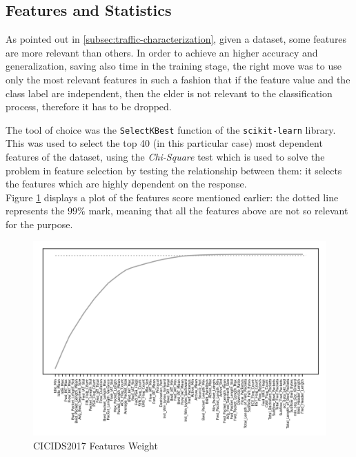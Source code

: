 
\subsection{Features and Statistics}
\label{subsec:features-statistics}

As pointed out in \ref{subsec:traffic-characterization}, given a dataset, some features are more relevant than others. In order to achieve an higher accuracy and generalization, saving also time in the training stage, the right move was to use only the most relevant features in such a fashion that if the feature value and the class label are independent, then the elder is not relevant to the classification process, therefore it has to be dropped.
\par The tool of choice was the \texttt{SelectKBest} function of the \texttt{scikit-learn} library. This was used to select the top 40 (in this particular case) most dependent features of the dataset, using the \textit{Chi-Square} test which is used to solve the problem in feature selection by testing the relationship between them: it selects the features which are highly dependent on the response. \\ Figure \ref{fig:features-weight} displays a plot of the features score mentioned earlier: the dotted line  represents the $99\%$ mark, meaning that all the features above are not so relevant for the purpose.

\begin{figure}[h!]
    \centering
    \includegraphics[scale=1]{assets/figures/chapter3/features99.png}
    \caption{CICIDS2017 Features Weight}
    \label{fig:features-weight}
\end{figure}


